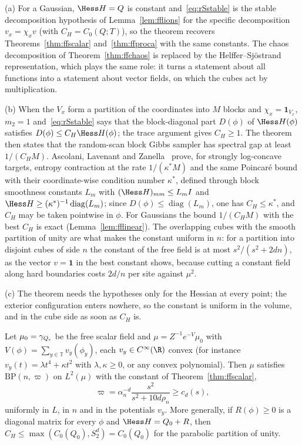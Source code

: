 \begin{remark}\label{rem:rSwittenremarks}
(a) For a Gaussian, $\Hess H=Q$ is constant and~\eqref{eq:rSstable} is the
stable decomposition hypothesis of Lemma~\ref{lem:fflions} for the specific
decomposition $v_x=\chi_xv$ (with $C_H=C_0(Q;T)$), so the theorem recovers
Theorems~\ref{thm:ffscalar} and~\ref{thm:ffproca} with the same constants.
The chaos decomposition of Theorem~\ref{thm:ffchaos} is replaced by the
Helffer--Sj\"ostrand representation, which plays the same role: it turns a
statement about all functions into a statement about vector fields, on
which the cubes act by multiplication.

(b) When the $V_x$ form a partition of the coordinates into $M$ blocks and
$\chi_x=\mathbf 1_{V_x}$, $m_2=1$ and~\eqref{eq:rSstable} says that the
block-diagonal part $D(\phi)$ of $\Hess H(\phi)$ satisfies $D(\phi)\le C_H
\Hess H(\phi)$; the trace argument gives $C_H\ge1$. The theorem then states
that the random-scan block Gibbs sampler has spectral gap at least
$1/(C_HM)$. Ascolani, Lavenant and Zanella~\cite[Theorem~3.2 and
Corollary~3.7]{ALZ24} prove, for strongly log-concave targets, entropy
contraction at the rate $1/(\kappa^*M)$ and the same Poincar\'e bound with
their coordinate-wise condition number $\kappa^*$, defined through block
smoothness constants $L_m$ with $(\Hess H)_{mm}\le L_mI$ and $\Hess H\ge
(\kappa^*)^{-1}\operatorname{diag}(L_m)$; since $D(\phi)\le\operatorname{diag}
(L_m)$, one has $C_H\le\kappa^*$, and $C_H$ may be taken pointwise in
$\phi$. For Gaussians the bound $1/(C_HM)$ with the best $C_H$ is exact
(Lemma~\ref{lem:fflinear}). The overlapping cubes with the smooth partition
of unity are what makes the constant uniform in $n$: for a partition into
disjoint cubes of side $n$ the constant of the free field is at most
$s^2/(s^2+2dn)$, as the vector $v=\mathbf 1$ in the best constant shows,
because cutting a constant field along hard boundaries costs $2d/n$ per site
against $\mu^2$.

(c) The theorem needs the hypotheses only for the Hessian at every point;
the exterior configuration enters nowhere, so the constant is uniform in
the volume, and in the cube side as soon as $C_H$ is.
\end{remark}

\begin{corollary}\label{cor:rSonsite}
Let $\mu_0=\gamma_{Q_{\rm s}}$ be the free scalar field and $\mu=Z^{-1}
e^{-V}\mu_0$ with $V(\phi)=\sum_{y\in\mathbb T}v_y(\phi_y)$, each $v_y\in
C^\infty(\R)$ convex (for instance $v_y(t)=\lambda t^4+\kappa t^2$ with
$\lambda,\kappa\ge0$, or any convex polynomial). Then $\mu$ satisfies
$\mathrm{BP}(n,\varpi)$ on $L^2(\mu)$ with the constant of
Theorem~\ref{thm:ffscalar},
\[
\varpi=\alpha_n^{-d}\frac{s^2}{s^2+10d\rho_n}\ge c_d(s),
\]
uniformly in $L$, in $n$ and in the potentials $v_y$. More generally, if
$R(\phi)\ge0$ is a diagonal matrix for every $\phi$ and $\Hess H=Q_0+R$,
then $C_H\le\max(C_0(Q_0),S_2^d)=C_0(Q_0)$ for the parabolic partition of
unity.
\end{corollary}


